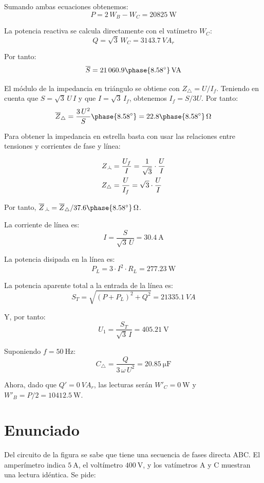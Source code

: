Sumando ambas ecuaciones obtenemos:
\[
  P = 2 \,W_B - W_C = \SI{20825}{\watt}
\]

La potencia reactiva se calcula directamente con el vatímetro $W_C$:
\[
  Q = \sqrt{3} \, W_C = \SI{3143.7}{VA}_r
\]

Por tanto:
\[
  \overline{S} =
  21\,060.9\phase{\ang{8.58}}\,\unit{VA}
\]

El módulo de la impedancia en triángulo se obtiene con
$Z_{\triangle} = U / I_f$. Teniendo en cuenta que $S = \sqrt{3} \,U \,I$
y que $I = \sqrt{3} \,I_f$, obtenemos $I_f = S / 3U$. Por tanto:
\[
  \overline{Z}_{\triangle} = \frac{3 \, U^2}{S}\phase{\ang{8.58}} =
  {22.8\phase{\ang{8.58}}}\,\unit{\ohm}
\]


Para obtener la impedancia en estrella basta con usar las relaciones
entre tensiones y corrientes de fase y línea:

\vspace{-6mm}
\begin{align*}
  Z_{\wye} &= \frac{U_f}{I} = \frac{1}{\sqrt{3}} \cdot \frac{U}{I}\\
  Z_\triangle &= \frac{U}{I_f} = \sqrt{3} \cdot \frac{U}{I}
\end{align*}

Por tanto, $\overline{Z}_{\wye} = \overline{Z}_{\triangle} / 37.6\phase{\ang{8.58}}\,\unit{\ohm}$.

\vspace{3mm}
La corriente de línea es:
\[
  I = \frac{S}{\sqrt{3} \,U} = \SI{30.4}{\ampere}
\]

La potencia disipada en la línea es:
\[
  P_L = 3 \cdot I^2 \cdot R_L = \SI{277.23}{\watt}
\]

La potencia aparente total a la entrada de la línea es:
\[
  S_T = \sqrt{(P + P_L)^2 + Q^2} = \SI{21335.1}{VA}
\]

Y, por tanto:
\[
  U_1 = \frac{S_T}{\sqrt{3} \,I} = \SI{405.21}{\volt}
\]

Suponiendo $f = \SI{50}{\hertz}$:
\[
  C_{\triangle} = \frac{Q}{3 \,\omega \,U^2} = \SI{20.85}{\micro\farad}
\]

Ahora, dado que $Q' = \SI{0}{VA}_r$, las lecturas serán $W'_C = \SI{0}{\watt}$ y
$W'_B = P/2 = \SI{10412.5}{\watt}$.



\section{Enunciado}

Del circuito de la figura se sabe que tiene una secuencia de fases
directa ABC. El amperímetro indica $\SI{5}{\ampere}$, el voltímetro
$\SI{400}{\volt}$, y los vatímetros A y C muestran una lectura
idéntica. Se pide:

